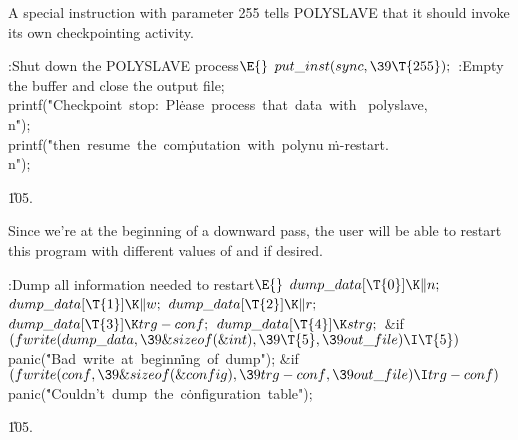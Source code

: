 A special  instruction with parameter 255 tells {\mc
POLYSLAVE}
that it should invoke its own checkpointing activity.

\Y\B\4:Shut down the {\mc POLYSLAVE} process\X${}\E{}$\6
$\\{put\_inst}(\\{sync},\39\T{255});{}$\6
:Empty the buffer and close the output file\X;\6
\\{printf}(\.{"Checkpoint\ stop:\ Pl}\)\.{ease\ process\ that\ da}\)\.{ta\ with%
\ polyslave,\\n}\)\.{"});\6
\\{printf}(\.{"then\ resume\ the\ com}\)\.{putation\ with\ polynu}\)%
\.{m-restart.\\n"});\par
\U105.\fi

Since we're at the beginning of a downward pass, the user will be
able to restart this program with different values of  and
 if desired.

\Y\B\4:Dump all information needed to restart\X${}\E{}$\6
$\\{dump\_data}[\T{0}]\K\|n;{}$\6
${}\\{dump\_data}[\T{1}]\K\|w;{}$\6
${}\\{dump\_data}[\T{2}]\K\|r;{}$\6
${}\\{dump\_data}[\T{3}]\K\\{trg}-\\{conf};{}$\6
${}\\{dump\_data}[\T{4}]\K\\{strg};{}$\6
\&{if} ${}(\\{fwrite}(\\{dump\_data},\39\&{sizeof}(\&{int}),\39\T{5},\39\\{out%
\_file})\I\T{5}){}$\1\5
\\{panic}(\.{"Bad\ write\ at\ beginn}\)\.{ing\ of\ dump"});\2\6
\&{if} ${}(\\{fwrite}(\\{conf},\39\&{sizeof}(\&{config}),\39\\{trg}-\\{conf},%
\39\\{out\_file})\I\\{trg}-\\{conf}){}$\1\5
\\{panic}(\.{"Couldn't\ dump\ the\ c}\)\.{onfiguration\ table"});\2\par
\U105.\fi

